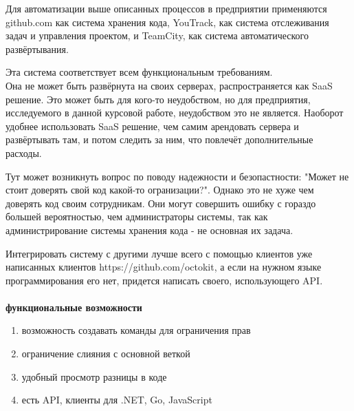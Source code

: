 \documentclass{article}
\begin{document}

Для автоматизации выше описанных процессов в предприятии применяются github.com как система хранения кода,
YouTrack, как система отслеживания задач и управления проектом, и TeamCity, как система автоматического развёртывания.


Эта система соответствует всем функциональным требованиям.\\
Она не может быть развёрнута на своих серверах, распространяется как SaaS решение.
Это может быть для кого-то неудобством, но для предприятия, исследуемого в данной курсовой работе, неудобством это не является.
Наоборот удобнее использовать SaaS решение, чем самим арендовать сервера и развёртывать там, и потом следить за ним, что повлечёт дополнительные расходы.

Тут может возникнуть вопрос по поводу надежности и безопастности: "Может не стоит доверять свой код какой-то огранизации?". Однако это не хуже
чем доверять код своим сотрудникам. Они могут совершить ошибку с гораздо большей вероятностью, чем администраторы системы, так как администрирование
системы хранения кода - не основная их задача.

Интегрировать систему с другими лучше всего с помощью клиентов уже написанных клиентов https://github.com/octokit, а если на нужном языке программирования его нет,
придется написать своего, использующего API.
\\\\
\textbf{функциональные возможности}
\begin{enumerate}
    \item{возможность создавать команды для ограничения прав}
    \item{ограничение слияния с основной веткой}
    \item{удобный просмотр разницы в коде}
    \item{есть API, клиенты для .NET, Go, JavaScript}
\end{enumerate}
\end{document}
